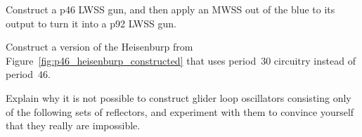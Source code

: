 \begin{multicols}{2}
	
	\mfilbreak
	
	
	\begin{problem}\label{exer:mwss_out_of_blue_double_period} 
		Construct a p46 LWSS gun, and then apply an MWSS out of the blue to its output to turn it into a p92 LWSS gun.
		
	\end{problem}
	
	
	\mfilbreak
	

	\begin{problem}\label{exer:construct_p30_heisenburp} 
		Construct a version of the Heisenburp from Figure~\ref{fig:p46_heisenburp_constructed} that uses period~$30$ circuitry instead of period~$46$.
	\end{problem}
	
	
	\mfilbreak
	
	
	\begin{problemstar}\label{exer:bumper_bouncer_wrong_color} 
		Explain why it is not possible to construct glider loop oscillators consisting only of the following sets of reflectors, and experiment with them to convince yourself that they really are impossible.\smallskip
		

\end{problemstar}
\end{multicols}
